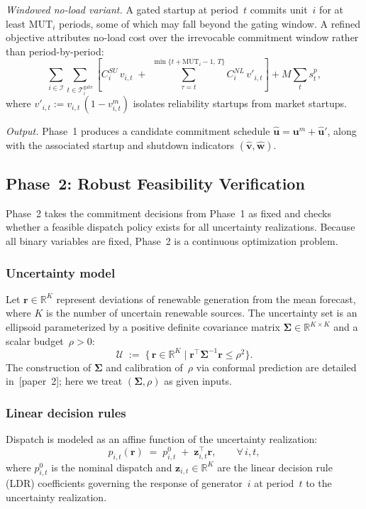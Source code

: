 \documentclass[journal]{IEEEtran}
\begin{document}
\emph{Windowed no-load variant.}
A gated startup at period~$t$ commits unit~$i$ for at least
$\text{MUT}_i$ periods, some of which may fall beyond the gating
window.
A refined objective attributes no-load cost over the irrevocable
commitment window rather than period-by-period:
\begin{equation}\label{eq:obj_window}
\sum_{i \in \mathcal{I}}
\sum_{t \in \mathcal{T}_i^{\text{gate}}}
\!\left[
  C_i^{SU}\, v_{i,t}
  \;+\;
  \sum_{\tau=t}^{\min\{t+\text{MUT}_i-1,\,T\}}
    \!\! C_i^{NL}\, v'_{i,t}
\right]
+ M \!\sum_t s_t^p,
\end{equation}
where $v'_{i,t} := v_{i,t}\,(1 - v_{i,t}^m)$ isolates reliability
startups from market startups.

\emph{Output.}
Phase~1 produces a candidate commitment schedule
$\hat{\mathbf{u}} = \mathbf{u}^m + \hat{\mathbf{u}}'$, along with
the associated startup and shutdown indicators
$(\hat{\mathbf{v}},\hat{\mathbf{w}})$.

\subsection{Phase~2: Robust Feasibility Verification}
\label{sec:phase2}

Phase~2 takes the commitment decisions from Phase~1 as fixed and
checks whether a feasible dispatch policy exists for all uncertainty
realizations.
Because all binary variables are fixed, Phase~2 is a continuous
optimization problem.

\subsubsection{Uncertainty model}
Let $\mathbf{r} \in \mathbb{R}^K$ represent deviations of renewable
generation from the mean forecast, where $K$ is the number of
uncertain renewable sources.
The uncertainty set is an ellipsoid parameterized by a positive
definite covariance matrix
$\boldsymbol{\Sigma} \in \mathbb{R}^{K \times K}$ and a scalar
budget~$\rho > 0$:
\begin{equation}\label{eq:uset}
    \mathcal{U} \;:=\;
    \bigl\{\, \mathbf{r} \in \mathbb{R}^K \;\big|\;
    \mathbf{r}^\top \boldsymbol{\Sigma}^{-1} \mathbf{r}
    \leq \rho^2 \bigr\}.
\end{equation}
The construction of $\boldsymbol{\Sigma}$ and calibration of~$\rho$
via conformal prediction are detailed in~[paper~2]; here we treat
$(\boldsymbol{\Sigma}, \rho)$ as given inputs.

\subsubsection{Linear decision rules}
Dispatch is modeled as an affine function of the uncertainty
realization:
\begin{equation}\label{eq:ldr}
    p_{i,t}(\mathbf{r})
    \;=\; p_{i,t}^0
    \;+\; \mathbf{z}_{i,t}^\top \mathbf{r},
    \qquad \forall\, i,t,
\end{equation}
where $p_{i,t}^0$ is the nominal dispatch and
$\mathbf{z}_{i,t} \in \mathbb{R}^K$ are the linear decision rule
(LDR) coefficients governing the response of generator~$i$ at
period~$t$ to the uncertainty realization.
\end{document}
